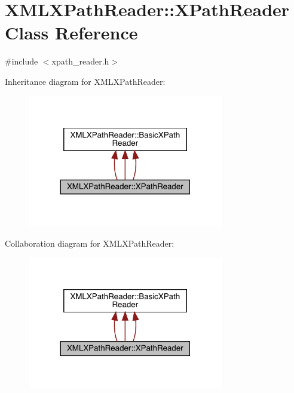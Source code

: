 \hypertarget{classXMLXPathReader_1_1XPathReader}{}\section{X\+M\+L\+X\+Path\+Reader\+:\+:X\+Path\+Reader Class Reference}
\label{classXMLXPathReader_1_1XPathReader}


{\ttfamily \#include $<$xpath\+\_\+reader.\+h$>$}



Inheritance diagram for X\+M\+L\+X\+Path\+Reader\+:
\nopagebreak
\begin{figure}[H]
\begin{center}
\leavevmode
\includegraphics[width=242pt]{d8/dcd/classXMLXPathReader_1_1XPathReader__inherit__graph}
\end{center}
\end{figure}


Collaboration diagram for X\+M\+L\+X\+Path\+Reader\+:
\nopagebreak
\begin{figure}[H]
\begin{center}
\leavevmode
\includegraphics[width=242pt]{d4/d59/classXMLXPathReader_1_1XPathReader__coll__graph}
\end{center}
\end{figure}

